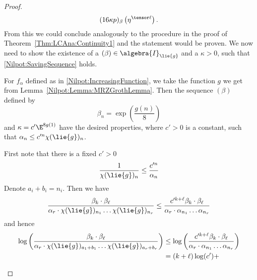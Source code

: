\begin{proof}
\begin{align*}
       	(16 \kappa p)_{\beta}
       	\left( \eta^{\tensor \ell} \right).
    \end{align*}
    From this we could conclude analogously to the procedure in the proof of 
    Theorem~\ref{Thm:LCAna:Continuity1} and the statement would be proven.
    We now need to show the existence of a $(\beta) \in \algebra{I}_{\lie{g}}$ 
    and a $\kappa > 0$, such that \eqref{Nilpot:SavingSequence} holds.
    \begin{claim}
    		For $f_{\alpha}$ defined as in \eqref{Nilpot:IncreasingFunction}, we 
    		take the function $g$ we get from 
    		Lemma~\ref{Nilpot:Lemma:MRZGrothLemma}. Then the sequence $(\beta)$ 
    		defined by
    		\begin{equation}
    			\beta_n
    			=
    			\exp \left(
    				\frac{g(n)}{8}
    			\right)
    		\end{equation}
    		and $\kappa = c' \E^{8 g(1)}$ have the desired properties, where 
    		$c' > 0$ is a constant, such that $\alpha_n \leq c'^n \chi(\lie{g})_n$.
    \end{claim}
    \begin{subproof}
    		First note that there is a fixed $c' > 0$
    		\begin{equation*}
    			\frac{1}{\chi(\lie{g})_n}
    			\leq
    			\frac{c'^n}{\alpha_n}
    		\end{equation*}
    		Denote $a_i + b_i = n_i$. Then we have
    		\begin{equation*}
    			\frac{\beta_k \cdot \beta_{\ell}}
	       	{
	       		\alpha_r
	       		\cdot
	       		\chi(\lie{g})_{n_1}
	       		\ldots
	       		\chi(\lie{g})_{n_r}
	       	}
	       	\leq
    			\frac{c'^{k + \ell} \beta_k \cdot \beta_{\ell}}
	       	{
	       		\alpha_r
	       		\cdot
	       		\alpha_{n_1}
	       		\ldots
	       		\alpha_{n_r}
	       	}
    		\end{equation*}
    		and hence
    		\begin{align*}
    			\log \left(
    				\frac{\beta_k \cdot \beta_{\ell}}
		       	{
		       		\alpha_r
		       		\cdot
		       		\chi(\lie{g})_{a_1 + b_1}
		       		\ldots
		       		\chi(\lie{g})_{a_r + b_r}
		       	}
	       	\right)
	       	& \leq
    			\log \left(
    				\frac{c'^{k + \ell} \beta_k \cdot \beta_{\ell}}
		       	{
		       		\alpha_r
		       		\cdot
		       		\alpha_{n_1}
		       		\ldots
		       		\alpha_{n_r}
		       	}
	       	\right)
	       	\\
	       	& =
	       	(k + \ell) \log(c')
	       	+

\end{align*}
\end{subproof}
\end{proof}
